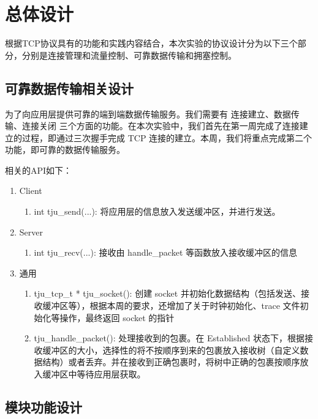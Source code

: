 
\chapter{总体设计}

根据TCP协议具有的功能和实践内容结合，本次实验的协议设计分为以下三个部分，分别是连接管理和流量控制、可靠数据传输和拥塞控制。

\section{可靠数据传输相关设计}

为了向应用层提供可靠的端到端数据传输服务。我们需要有 连接建立、数据传输、连接关闭 三个方面的功能。在本次实验中，我们首先在第一周完成了连接建立的过程，即通过三次握手完成 TCP 连接的建立。本周，我们将重点完成第二个功能，即可靠的数据传输服务。

相关的API如下：
\begin{enumerate}
  \item Client \begin{enumerate}
    \item int tju\_send(...): 将应用层的信息放入发送缓冲区，并进行发送。
  \end{enumerate}
  \item Server \begin{enumerate}
    \item int tju\_recv(...): 接收由 handle\_packet 等函数放入接收缓冲区的信息
  \end{enumerate}
  \item 通用 \begin{enumerate}
      \item tju\_tcp\_t * tju\_socket(): 创建 socket 并初始化数据结构（包括发送、接收缓冲区等），根据本周的要求，还增加了关于时钟初始化、trace 文件初始化等操作，最终返回 socket 的指针
      \item tju\_handle\_packet(): 处理接收到的包裹。在 Established 状态下，根据接收缓冲区的大小，选择性的将不按顺序到来的包裹放入接收树（自定义数据结构）或者丢弃。并在接收到正确包裹时，将树中正确的包裹按顺序放入缓冲区中等待应用层获取。
  \end{enumerate}
\end{enumerate}

\section{模块功能设计}

